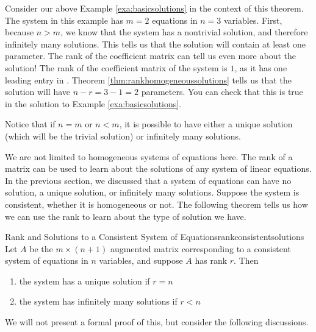 Consider our above Example \ref{exa:basicsolutions} in the context of
this theorem. The system in this example has $m = 2$ equations in $n =
3$ variables.  First, because $n>m$, we know that the system has a
nontrivial solution, and therefore infinitely many solutions. This
tells us that the solution will contain at least one parameter. The
rank of the coefficient matrix can tell us even more about the
solution! The rank of the coefficient matrix of the system is $1$, as
it has one leading entry in \ef. Theorem \ref{thm:rankhomogeneoussolutions} tells us that the
solution will have $n-r = 3-1 = 2$ parameters. You can check that this
is true in the solution to Example \ref{exa:basicsolutions}.

Notice that if $n=m$ or $n<m$, it is possible to have either a unique solution (which will be the trivial solution) or infinitely many solutions. 

We are not limited to homogeneous systems of equations here. The rank of a matrix can be used to learn about the 
solutions of any system of linear equations. 
In the previous section, we discussed that a system of equations can have no solution, a unique solution, or infinitely many solutions.
Suppose the system is consistent, whether it is homogeneous or not. The following theorem tells us
how we can use the rank to learn about the type of solution we have. 

\begin{theorem}{Rank and Solutions to a Consistent System of Equations}{rankconsistentsolutions}
Let $A$ be the $m \times \left( n+1 \right) $ augmented matrix corresponding to a consistent system of equations in $n$ variables, and suppose $A$ has rank $r$.
Then
\begin{enumerate}
\item the system has a unique solution if $r = n $
\item the system has infinitely many solutions if $r < n$
\end{enumerate}
\end{theorem}

We will not present a formal proof of this, but consider the following discussions. 

